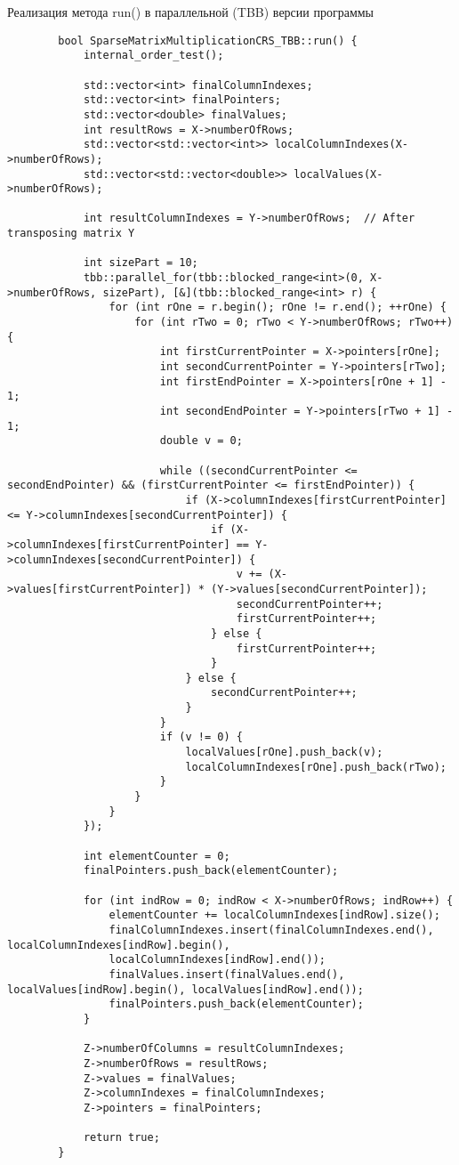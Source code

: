 \documentclass[a4paper, 14pt]{article}
\begin{document}
	Реализация метода run() в параллельной (TBB) версии программы
	\begin{verbatim}
		bool SparseMatrixMultiplicationCRS_TBB::run() {
			internal_order_test();
			
			std::vector<int> finalColumnIndexes;
			std::vector<int> finalPointers;
			std::vector<double> finalValues;
			int resultRows = X->numberOfRows;
			std::vector<std::vector<int>> localColumnIndexes(X->numberOfRows);
			std::vector<std::vector<double>> localValues(X->numberOfRows);
			
			int resultColumnIndexes = Y->numberOfRows;  // After transposing matrix Y
			
			int sizePart = 10;
			tbb::parallel_for(tbb::blocked_range<int>(0, X->numberOfRows, sizePart), [&](tbb::blocked_range<int> r) {
				for (int rOne = r.begin(); rOne != r.end(); ++rOne) {
					for (int rTwo = 0; rTwo < Y->numberOfRows; rTwo++) {
						int firstCurrentPointer = X->pointers[rOne];
						int secondCurrentPointer = Y->pointers[rTwo];
						int firstEndPointer = X->pointers[rOne + 1] - 1;
						int secondEndPointer = Y->pointers[rTwo + 1] - 1;
						double v = 0;
						
						while ((secondCurrentPointer <= secondEndPointer) && (firstCurrentPointer <= firstEndPointer)) {
							if (X->columnIndexes[firstCurrentPointer] <= Y->columnIndexes[secondCurrentPointer]) {
								if (X->columnIndexes[firstCurrentPointer] == Y->columnIndexes[secondCurrentPointer]) {
									v += (X->values[firstCurrentPointer]) * (Y->values[secondCurrentPointer]);
									secondCurrentPointer++;
									firstCurrentPointer++;
								} else {
									firstCurrentPointer++;
								}
							} else {
								secondCurrentPointer++;
							}
						}
						if (v != 0) {
							localValues[rOne].push_back(v);
							localColumnIndexes[rOne].push_back(rTwo);
						}
					}
				}
			});
			
			int elementCounter = 0;
			finalPointers.push_back(elementCounter);
			
			for (int indRow = 0; indRow < X->numberOfRows; indRow++) {
				elementCounter += localColumnIndexes[indRow].size();
				finalColumnIndexes.insert(finalColumnIndexes.end(), localColumnIndexes[indRow].begin(),
				localColumnIndexes[indRow].end());
				finalValues.insert(finalValues.end(), localValues[indRow].begin(), localValues[indRow].end());
				finalPointers.push_back(elementCounter);
			}
			
			Z->numberOfColumns = resultColumnIndexes;
			Z->numberOfRows = resultRows;
			Z->values = finalValues;
			Z->columnIndexes = finalColumnIndexes;
			Z->pointers = finalPointers;
			
			return true;
		}
	\end{verbatim}
	
\end{document}
